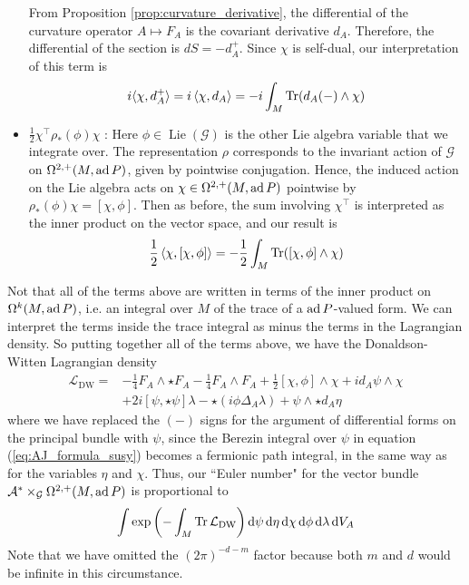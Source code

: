 \begin{itemize}[leftmargin=\parindent]
From Proposition \ref{prop:curvature_derivative}, the
differential of the curvature operator $A \mapsto F_A$ is the covariant
derivative  $d_A$. Therefore, the differential of the section is $dS = -d_A^+$.
Since $\chi$ is self-dual, our interpretation of this term is 
\[
	i\gen[*]{\chi,d_A^+} =i\gen{\chi,d_A}
	= -i\int_M \Tr(d_A(-)\wedge \chi)
\] 

	\item 
$\frac{1}{2}\chi^\intercal \rho_*(\phi)\chi$ :
Here $\phi \in \operatorname{Lie}(\mathcal{G})$ is the other Lie algebra 
variable that we integrate over. The representation $\rho$ corresponds to the
invariant action of $\mathcal{G}$ on $\Omega^{2,+}(M,\operatorname{ad} P)$, given by pointwise
conjugation. Hence, the induced action on the Lie algebra acts on $\chi\in
\Omega^{2,+}(M,\operatorname{ad} P)$ pointwise by $\rho_*(\phi) \chi = [\chi,\phi]$. 
Then as before, the sum involving  $\chi^\intercal$ is interpreted as the inner
product on the vector space, and our result is  
\[
\frac{1}{2} \gen{\chi,[\chi,\phi]} 
= -\frac{1}{2} \int_M \Tr([\chi,\phi]\wedge \chi)
\] 
\end{itemize}

Not that all of the terms above are written in terms of the inner product on
$\Omega^k(M,\operatorname{ad} P)$, i.e. an integral over $M$ of the trace of a $\operatorname{ad} P$-valued
form. We can interpret the terms inside the trace integral as minus the terms 
in the Lagrangian
density. So putting together all of the terms above, we have the
Donaldson-Witten Lagrangian density
\begin{align}
	\mathcal{L}_{\text{DW}}
	= &-\frac{1}{4}F_A\wedge\star F_A - \frac{1}{4}F_A\wedge F_A
	+\frac{1}{2} [\chi,\phi]\wedge \chi + id_A\psi\wedge \chi \nonumber \\
	& +2i[\psi,\star\psi]\lambda - \star(i\phi \Delta_A\lambda) + 
	\psi\wedge \star d_A\eta \label{eq:dw_lagrangian}
\end{align}
where we have replaced the $(-)$ signs for the argument of differential forms on
the principal bundle with  $\psi$, since the Berezin integral over $\psi$ in 
equation (\ref{eq:AJ_formula_susy}) becomes a fermionic path integral, in the
same way as for the variables $\eta$ and $\chi$. 
Thus, our ``Euler number" for the vector bundle $\mathcal{A}^*
\times_\mathcal{G}\Omega^{2,+}(M,\operatorname{ad} P)$ is proportional to
\[
	\int \exp \paren{-\int_M \Tr \mathcal{L}_{\text{DW}} }
	\odif{\psi}\odif{\eta} \odif{\chi} \odif{\phi}\odif{\lambda}\odif{V_A} 
\] 
Note that we have omitted the $(2\pi)^{-d-m}$ factor because both $m$ and  $d$
would be infinite in this circumstance. 

